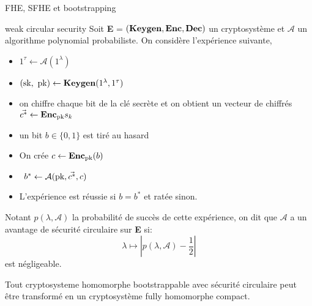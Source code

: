 \begin{section}{FHE, SFHE et bootstrapping}
\begin{definition}{weak circular security}
Soit \textbf{E} = $(\text{\textbf{Keygen}}, \text{\textbf{Enc}}, \text{\textbf{Dec}})$ un cryptosystème et $\mathcal{A}$ un
algorithme polynomial probabiliste. 
On considère l'expérience suivante, 
\begin{itemize}
\item $1^\tau \leftarrow \mathcal{A}(1^\lambda)$ 
\item $(\sk, \pk) \leftarrow \Keygen(1^\lambda, 1^\tau)$
\item on chiffre chaque bit de la clé secrète et on obtient un vecteur de
chiffrés $\vec{c^*} \leftarrow \text{\textbf{Enc}}_{\text{pk}}{s_k}$
\item un bit $b\in \{0,1\}$ est tiré au hasard
\item On crée $c \leftarrow \text{\textbf{Enc}}_{\text{pk}}(b)$ 
\item $b^* \leftarrow \mathcal{A}(\text{pk}, \vec{c^*}, c)$
\item L'expérience est réussie si $b = b^*$ et ratée sinon.
\end{itemize}
Notant $p(\lambda, \mathcal{A})$ la probabilité de succès de cette expérience, on dit
que $\mathcal{A}$ a un avantage de sécurité circulaire sur \textbf{E} si:
\[\lambda \mapsto |p(\lambda, \mathcal{A}) - \frac{1}{2}| \]
est négligeable.
\end{definition}

\begin{thm}
Tout cryptosysteme homomorphe bootstrappable avec sécurité circulaire peut être transformé en un 
cryptosystème fully homomorphe compact.
\end{thm}





\end{section}
